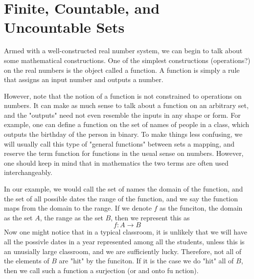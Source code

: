 \documentclass[../../templates/section]{subfiles}
\begin{document}
\section{Finite, Countable, and Uncountable Sets}
Armed with a well-constructed real number system, we can begin to talk about
some mathematical constructions. One of the simplest constructions 
(operations?) on the real numbers is the object called a function. A function
is simply a rule that assigns an input number and outputs a number. 

However, note that the notion of a function is not
constrained to operations on numbers. It can make as much sense to talk about a 
function on an arbitrary set, and the "outputs" need not even resemble the 
inputs in any shape or form. For example, one can define a function on the set
of names of people in a class, which outputs the birthday of the person in
binary. To make things less confusing, we will usually call this type of 
"general functions" between sets a mapping, and reserve the term function for 
functions in the usual sense on numbers. However, one should keep in mind that
in mathematics the two terms are often used interchangeably.

In our example, we would call the set of names the domain of the function, and
the set of all possible dates the range of the function, and we say the function
maps from the domain to the range. If we denote $f$ as the funciton, the domain
as the set $A$, the range as the set $B$, then we represent this as
\[
f:A\rightarrow B
\]
Now one might notice that in a typical classroom, it is unlikely that we will 
have all the possivle dates in a year represented among all the students, unless
this is an unusially large classroom, and we are sufficiently lucky. Therefore,
not all of the elements of $B$ are "hit" by the funciton. If it is the case we 
do "hit" all of $B$, then we call such a function a surjection (or and onto fu
nction). 
\end{document}
